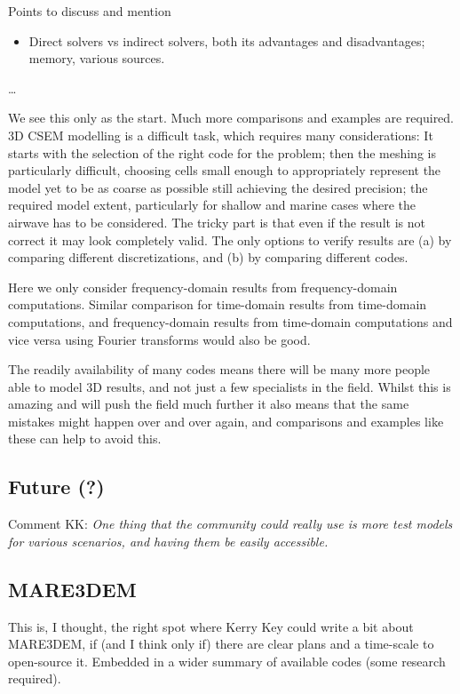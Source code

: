 \documentclass[
    paper,
  ]{geophysics}
\begin{document}
Points to discuss and mention
\begin{itemize}
  \item Direct solvers vs indirect solvers, both its advantages and
    disadvantages; memory, various sources.
\end{itemize}

\dots

We see this only as the start. Much more comparisons and examples are required.
3D CSEM modelling is a difficult task, which requires many considerations: It
starts with the selection of the right code for the problem; then the meshing
is particularly difficult, choosing cells small enough to appropriately
represent the model yet to be as coarse as possible still achieving the desired
precision; the required model extent, particularly for shallow and marine cases
where the airwave has to be considered. The tricky part is that even if the
result is not correct it may look completely valid. The only options to verify
results are (a) by comparing different discretizations, and (b) by comparing
different codes.

Here we only consider frequency-domain results from frequency-domain
computations. Similar comparison for time-domain results from time-domain
computations, and frequency-domain results from time-domain computations and
vice versa using Fourier transforms would also be good.

The readily availability of many codes means there will be many more people
able to model 3D results, and not just a few specialists in the field. Whilst
this is amazing and will push the field much further it also means that the
same mistakes might happen over and over again, and comparisons and examples
like these can help to avoid this.

\subsection{Future (?)}

Comment KK: \emph{One thing that the community could really use is more test
models for various scenarios, and having them be easily accessible.}


\subsection{MARE3DEM}

This is, I thought, the right spot where Kerry Key could write a bit about
MARE3DEM, if (and I think only if) there are clear plans and a time-scale to
open-source it. Embedded in a wider summary of available codes (some research
required).
\end{document}
